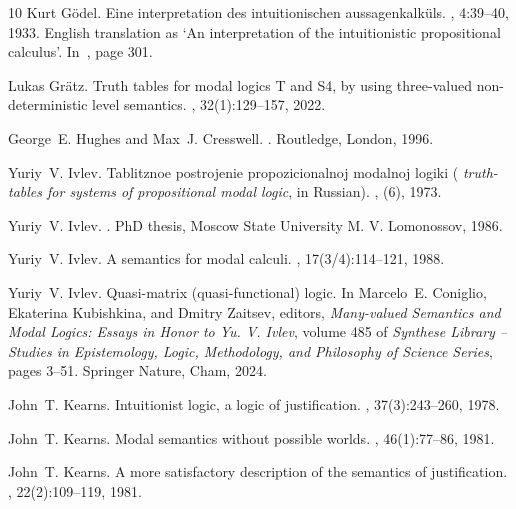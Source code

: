 \documentclass[12pt]{article}
\begin{document}
\begin{thebibliography}{10}
Kurt G\"{o}del.
\newblock Eine interpretation des intuitionischen aussagenkalk\"{u}ls.
, 4:39--40, 1933.
\newblock English translation as `An interpretation of the intuitionistic
  propositional calculus'. In~\cite{Feferman:etal:1986}, page 301.

Lukas Grätz.
\newblock Truth tables for modal logics {T and S4}, by using three-valued
  non-deterministic level semantics.
, 32(1):129--157, 2022.

George~E. Hughes and Max~J. Cresswell.
.
\newblock Routledge, London, 1996.

Yuriy~V. Ivlev.
\newblock Tablitznoe postrojenie propozicionalnoj modalnoj logiki ({\em
  {t}ruth-tables for systems of propositional modal logic}, in {R}ussian).
, (6), 1973.

Yuriy~V. Ivlev.
.
\newblock PhD thesis, Moscow State University M. V. Lomonossov, 1986.

Yuriy~V. Ivlev.
\newblock A semantics for modal calculi.
, 17(3/4):114--121, 1988.

Yuriy~V. Ivlev.
\newblock Quasi-matrix (quasi-functional) logic.
\newblock In Marcelo~E. Coniglio, Ekaterina Kubishkina, and Dmitry Zaitsev,
  editors, {\em Many-valued Semantics and Modal Logics: Essays in Honor to Yu.
  V. Ivlev}, volume 485 of {\em Synthese Library – Studies in Epistemology,
  Logic, Methodology, and Philosophy of Science Series}, pages 3--51. Springer
  Nature, Cham, 2024.

John~T. Kearns.
\newblock Intuitionist logic, a logic of justification.
, 37(3):243--260, 1978.

John~T. Kearns.
\newblock Modal semantics without possible worlds.
, 46(1):77--86, 1981.

John~T. Kearns.
\newblock A more satisfactory description of the semantics of justification.
, 22(2):109--119, 1981.


\end{thebibliography}
\end{document}
